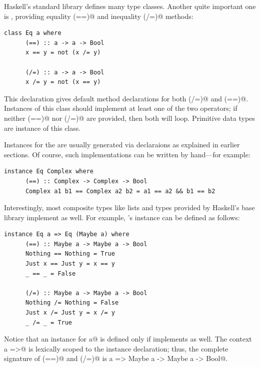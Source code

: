 \documentclass[UdineBachThesis,american,11pt,draft]{PhdThesis}
\begin{document}
  Haskell's standard library defines many type classes. Another quite important
  one is \lstinline@Eq@, providing equality \lstinline@(==)@ and inequality
  \lstinline@(/=)@ methods:

  \begin{lstlisting}[gobble=4,basicstyle=\ttfamily\small]
    class Eq a where
      (==) :: a -> a -> Bool
      x == y = not (x /= y)

      (/=) :: a -> a -> Bool
      x /= y = not (x == y)
  \end{lstlisting}

  This declaration gives default method declarations for both \lstinline@(/=)@
  and \lstinline@(==)@. Instances of this class should implement at least one of
  the two operators; if neither \lstinline@(==)@ nor \lstinline@(/=)@ are
  provided, then both will loop. Primitive data types are instance of this class.

  Instances for the \lstinline@Eq@ are usually generated via
  \lstinline@deriving@ declaraions as explained in earlier sections. Of course,
  such implementations can be written by hand---for example:

  \begin{lstlisting}[gobble=4,basicstyle=\ttfamily\small]
    instance Eq Complex where
      (==) :: Complex -> Complex -> Bool
      Complex a1 b1 == Complex a2 b2 = a1 == a2 && b1 == b2
  \end{lstlisting}

  Interestingly, most composite types like lists and types provided by Haskell's
  base library implement \lstinline@Eq@ as well. For example,
  \lstinline@Maybe@'s instance can be defined as follows:

  \begin{lstlisting}[gobble=4,basicstyle=\ttfamily\small]
    instance Eq a => Eq (Maybe a) where
      (==) :: Maybe a -> Maybe a -> Bool
      Nothing == Nothing = True
      Just x == Just y = x == y
      _ == _ = False

      (/=) :: Maybe a -> Maybe a -> Bool
      Nothing /= Nothing = False
      Just x /= Just y = x /= y
      _ /= _ = True
  \end{lstlisting}

  Notice that an \lstinline@Eq@ instance for \lstinline@Maybe a@ is defined only
  if \lstinline@a@ implements \lstinline@Eq@ as well. The context
  \lstinline@Eq a =>@ is lexically scoped to the instance declaration; thus, the
  complete signature of \lstinline@(==)@ and \lstinline@(/=)@ is
  \lstinline@Eq a => Maybe a -> Maybe a -> Bool@.
\end{document}
